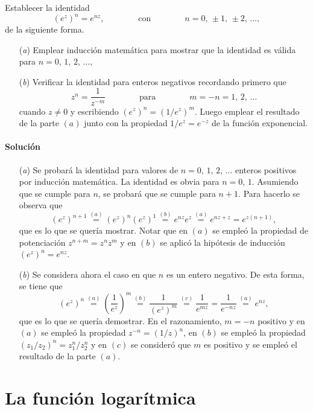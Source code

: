 \documentclass[a4paper]{report}
\begin{document}
Establecer la identidad
\[
 (e^z)^n=e^{nz},
 \qquad\qquad\textrm{con}\qquad\qquad
 n=0,\,\pm1,\,\pm2,\,\dots,
\]
de la siguiente forma.
\begin{enumerate}
 \item[(\textit{a})] Emplear inducción matemática para mostrar que la identidad es válida para \(n=0,\,1,\,2,\,\dots\),
 \item[(\textit{b})] Verificar la identidad para enteros negativos recordando primero que 
 \[
  z^n=\frac{1}{z^{-m}}
  \qquad\qquad\textrm{para}\qquad\qquad
 m=-n=1,\,2,\,\dots
 \]
 cuando \(z\neq0\) y escribiendo \((e^z)^n=(1/e^z)^m\). Luego emplear el resultado de la parte \((a)\) junto con la propiedad \(1/e^z=e^{-z}\) de la función exponencial.
\end{enumerate}

\paragraph{Solución} 

\begin{enumerate}
 \item[(\textit{a})] Se probará la identidad para valores de \(n=0,\,1,\,2,\,\dots\) enteros positivos por inducción matemática. La identidad es obvia para \(n=0,\,1\). Asumiendo que se cumple para \(n\), se probará que se cumple para \(n+1\). Para hacerlo se observa que 
 \[
  (e^z)^{n+1}\overset{(a)}{=}(e^z)^n(e^z)^1\overset{(b)}{=}e^{nz}e^z\overset{(a)}{=}e^{nz+z}=e^{z(n+1)},
 \]
 que es lo que se  quería mostrar. Notar que en \((a)\) se empleó la propiedad de potenciación \(z^{n+m}=z^nz^m\) y en \((b)\) se aplicó la hipótesis de inducción \((e^z)^n=e^{nz}\).
 \item[(\textit{b})] Se considera ahora el caso en que \(n\) es un entero negativo. De esta forma, se tiene que 
 \[
  (e^z)^n\overset{(a)}{=}\left(\frac{1}{e^z}\right)^m\overset{(b)}{=}\frac{1}{(e^z)^m}
  \overset{(c)}{=}\frac{1}{e^{mz}}=\frac{1}{e^{-nz}}\overset{(a)}{=}e^{nz},
 \]
 que es lo que se quería demostrar. En el razonamiento, \(m=-n\) positivo y en \((a)\) se empleó la propiedad \(z^{-n}=(1/z)^n\), en \((b)\) se empleó la propiedad \((z_1/z_2)^n=z_1^n/z_2^n\) y en \((c)\) se consideró que \(m\) es positivo y se empleó el resultado de la parte \((a)\).
\end{enumerate}

\section{La función logarítmica}\label{sec:logarithm_function}
\end{document}
